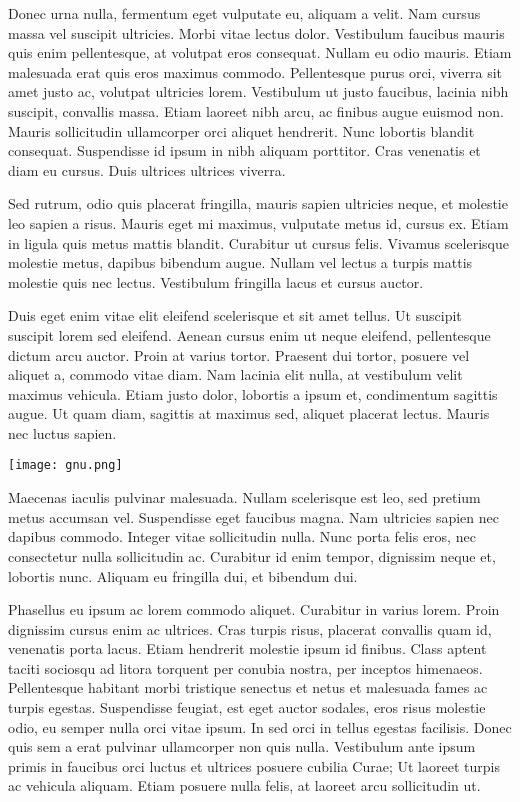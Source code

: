 Donec urna nulla, fermentum eget vulputate eu, aliquam a velit. Nam cursus massa vel suscipit ultricies. Morbi vitae lectus dolor. Vestibulum faucibus mauris quis enim pellentesque, at volutpat eros consequat. Nullam eu odio mauris. Etiam malesuada erat quis eros maximus commodo. Pellentesque purus orci, viverra sit amet justo ac, volutpat ultricies lorem. Vestibulum ut justo faucibus, lacinia nibh suscipit, convallis massa. Etiam laoreet nibh arcu, ac finibus augue euismod non. Mauris sollicitudin ullamcorper orci aliquet hendrerit. Nunc lobortis blandit consequat. Suspendisse id ipsum in nibh aliquam porttitor. Cras venenatis et diam eu cursus. Duis ultrices ultrices viverra.

Sed rutrum, odio quis placerat fringilla, mauris sapien ultricies neque, et molestie leo sapien a risus. Mauris eget mi maximus, vulputate metus id, cursus ex. Etiam in ligula quis metus mattis blandit. Curabitur ut cursus felis. Vivamus scelerisque molestie metus, dapibus bibendum augue. Nullam vel lectus a turpis mattis molestie quis nec lectus. Vestibulum fringilla lacus et cursus auctor.

Duis eget enim vitae elit eleifend scelerisque et sit amet tellus. Ut suscipit suscipit lorem sed eleifend. Aenean cursus enim ut neque eleifend, pellentesque dictum arcu auctor. Proin at varius tortor. Praesent dui tortor, posuere vel aliquet a, commodo vitae diam. Nam lacinia elit nulla, at vestibulum velit maximus vehicula. Etiam justo dolor, lobortis a ipsum et, condimentum sagittis augue. Ut quam diam, sagittis at maximus sed, aliquet placerat lectus. Mauris nec luctus sapien.

\begin{center}
\texttt{[image: gnu.png]}
\end{center}
Maecenas iaculis pulvinar malesuada. Nullam scelerisque est leo, sed pretium metus accumsan vel. Suspendisse eget faucibus magna. Nam ultricies sapien nec dapibus commodo. Integer vitae sollicitudin nulla. Nunc porta felis eros, nec consectetur nulla sollicitudin ac. Curabitur id enim tempor, dignissim neque et, lobortis nunc. Aliquam eu fringilla dui, et bibendum dui.

Phasellus eu ipsum ac lorem commodo aliquet. Curabitur in varius lorem. Proin dignissim cursus enim ac ultrices. Cras turpis risus, placerat convallis quam id, venenatis porta lacus. Etiam hendrerit molestie ipsum id finibus. Class aptent taciti sociosqu ad litora torquent per conubia nostra, per inceptos himenaeos. Pellentesque habitant morbi tristique senectus et netus et malesuada fames ac turpis egestas. Suspendisse feugiat, est eget auctor sodales, eros risus molestie odio, eu semper nulla orci vitae ipsum. In sed orci in tellus egestas facilisis. Donec quis sem a erat pulvinar ullamcorper non quis nulla. Vestibulum ante ipsum primis in faucibus orci luctus et ultrices posuere cubilia Curae; Ut laoreet turpis ac vehicula aliquam. Etiam posuere nulla felis, at laoreet arcu sollicitudin ut.

